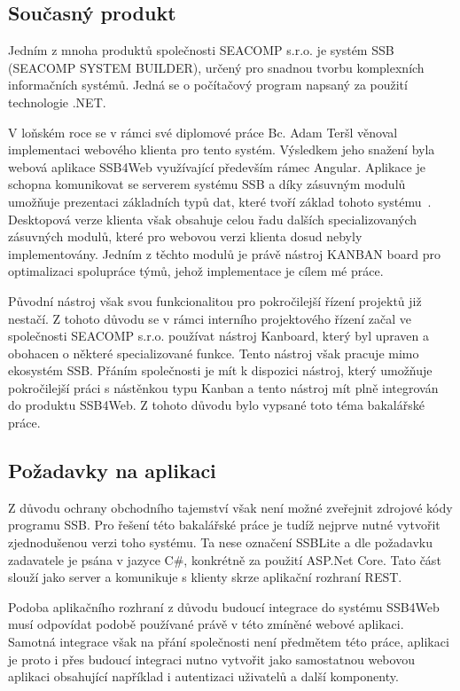 \subsection{Současný produkt}
Jedním z mnoha produktů společnosti SEACOMP s.r.o. je systém SSB (SEACOMP SYSTEM BUILDER), určený pro snadnou tvorbu komplexních informačních systémů. Jedná se o počítačový program napsaný za použití technologie .NET.

V loňském roce se v rámci své diplomové práce Bc. Adam Teršl věnoval implementaci webového klienta pro tento systém. Výsledkem jeho snažení byla webová aplikace SSB4Web využívající především rámec Angular. Aplikace je schopna komunikovat se serverem systému SSB a díky zásuvným modulů umožňuje prezentaci základních typů dat, které tvoří základ tohoto systému~\cite{bib:tersl}. Desktopová verze klienta však obsahuje celou řadu dalších specializovaných zásuvných modulů, které pro webovou verzi klienta dosud nebyly implementovány. Jedním z těchto modulů je právě nástroj KANBAN board pro optimalizaci spolupráce týmů, jehož implementace je cílem mé práce. 

Původní nástroj však svou funkcionalitou pro pokročilejší řízení projektů již nestačí. Z tohoto důvodu se v rámci interního projektového řízení začal ve společnosti SEACOMP s.r.o. používat nástroj Kanboard, který byl upraven a obohacen o některé specializované funkce. Tento nástroj však pracuje mimo ekosystém SSB. Přáním společnosti je mít k dispozici nástroj, který umožňuje pokročilejší práci s nástěnkou typu Kanban a tento nástroj mít plně integrován do produktu SSB4Web. Z tohoto důvodu bylo vypsané toto téma bakalářské práce.


\subsection{Požadavky na aplikaci}
Z důvodu ochrany obchodního tajemství však není možné zveřejnit zdrojové kódy programu SSB. Pro řešení této bakalářské práce je tudíž nejprve nutné vytvořit zjednodušenou verzi toho systému. Ta nese označení SSBLite a dle požadavku zadavatele je psána v jazyce C\#, konkrétně za použití ASP.Net Core. Tato část slouží jako server a komunikuje s klienty skrze aplikační rozhraní REST.

Podoba aplikačního rozhraní z důvodu budoucí integrace do systému SSB4Web musí odpovídat podobě používané právě v této zmíněné webové aplikaci. Samotná integrace však na přání společnosti není předmětem této práce, aplikaci je proto i přes budoucí integraci nutno vytvořit jako samostatnou webovou aplikaci obsahující například i autentizaci uživatelů a další komponenty.


